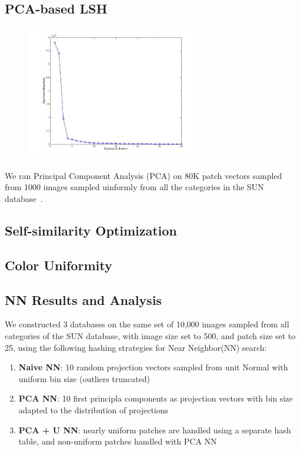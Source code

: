 \subsection{PCA-based LSH}


\begin{figure}[ht!]
\centering
\includegraphics[width=3in]{fig_NN/lambdas.jpg}
\label{fig:lambdas}
\end{figure}

We ran Principal Component Analysis (PCA) on 80K patch vectors
sampled from 1000 images
sampled uinformly from all the categories in the
SUN database~\cite{SUN}.


\subsection{Self-similarity Optimization}

\subsection{Color Uniformity}



\subsection{NN Results and Analysis}

We constructed 3 databases on the same set of
10,000 images sampled
from all categories of the SUN database, with image size
set to 500, and patch size set to 25, using the following
hashing strategies for Near Neighbor(NN) search:\\
\begin{enumerate}
\item \textbf{Naive NN}: 10 random projection vectors sampled from unit Normal with
uniform bin size (outliers truncated)
\item \textbf{PCA NN}: 10 first principla components as projection vectors with
bin size adapted to the distribution of projections
\item \textbf{PCA + U NN}: nearly uniform patches are handled using a separate
hash table, and non-uniform patches handled with PCA NN
\end{enumerate}

